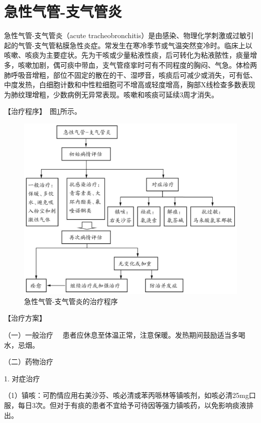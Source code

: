 \section{急性气管-支气管炎}

急性气管-支气管炎（acute
tracheobronchitis）是由感染、物理化学刺激或过敏引起的气管-支气管粘膜急性炎症。常发生在寒冷季节或气温突然变冷时。临床上以咳嗽、咳痰为主要症状。先为干咳或少量粘液性痰，后可转化为粘液脓性，痰量增多，咳嗽加剧，偶可痰中带血，支气管痉挛时可有不同程度的胸闷、气急。体检两肺呼吸音增粗，部位不固定的散在的干、湿啰音，咳痰后可减少或消失，可有低、中度发热，白细胞计数和中性粒细胞可不增高或轻度增高，胸部X线检查多数表现为肺纹理增粗，少数病例无异常表现。咳嗽和咳痰可延续3周才消失。

【治疗程序】　图\ref{fig1-2-1}所示。

\begin{figure}[!htbp]
 \centering
 \includegraphics{./images/Image00001.jpg}
 \captionsetup{justification=centering}
 \caption{急性气管-支气管炎的治疗程序}
 \label{fig1-2-1}
  \end{figure} 

【治疗方案】

{（一）一般治疗}
　患者应休息至体温正常，注意保暖。发热期间鼓励适当多喝水，忌烟。

{（二）药物治疗}

1. 对症治疗

（1）镇咳：可酌情应用右美沙芬、咳必清或苯丙哌林等镇咳剂，如咳必清25mg口服，每日3次。但对于有痰的患者不宜给予可待因等强力镇咳药，以免影响痰液排出。

